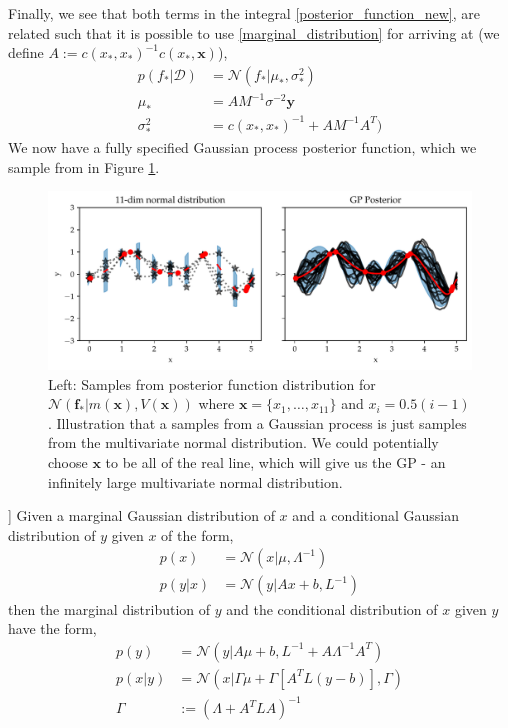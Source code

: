 Finally, we see that both terms in the integral \eqref{posterior_function_new}, are related such
that it is possible to use \eqref{marginal_distribution} for arriving at (we define $A :=  c(x_*,
x_*)^{-1} c(x_*, \textbf{x})$), 
\begin{align*}
    p(f_*|\mathcal{D}) &= \mathcal{N}(f_*|\mu_*,\sigma_*^2 )\\
    \mu_* &=  AM^{-1}\sigma^{-2}\textbf{y}\\
    \sigma_*^2 &=  c(x_*, x_*)^{-1}+AM^{-1}A^T)
\end{align*}
We now have a fully specified Gaussian process posterior function, which we sample from 
in Figure \ref{GP_illustration2}. 


\begin{figure}[h]
    \centering
    \includegraphics[width = \textwidth]{Pictures/GP2_samples_mattern.pdf}
    \caption{Left: Samples from posterior function distribution for
    $\mathcal{N}(\textbf{f}_*|m(\textbf{x}),V(\textbf{x}))$ where $\textbf{x} = \{x_1,\dots, x_{11}\}$
    and $x_i= 0.5(i-1)$. Illustration that a samples from a Gaussian process is just samples from
    the multivariate normal distribution. We could potentially choose $\textbf{x}$ to be all of the
    real line, which will give us the GP - an infinitely large multivariate normal distribution.}
    \label{GP_illustration2}
\end{figure}



\begin{testexample2}[Trick with normal distributions [from Bishops book?]]
    Given a marginal Gaussian distribution of $x$ and a conditional Gaussian distribution
    of $y$ given $x$ of the form, 
    \begin{align*}
        p(x) &= \mathcal{N}(x|\mu, \Lambda^{-1})\\
        p(y|x) &= \mathcal{N}(y|Ax+b, L^{-1})
    \end{align*}
    then the marginal distribution of $y$ and the conditional distribution of $x$ given $y$
    have the form, 
    \begin{align}
        p(y) &= \mathcal{N}(y|A\mu+b,L^{-1}+A \Lambda^{-1}A^T) \label{marginal_distribution}\\
        p(x|y) &= \mathcal{N}(x|\Gamma \mu+\Gamma [A^TL(y-b)],\Gamma )\\
        \Gamma &:= (\Lambda +A^TLA)^{-1}
    \end{align}
\end{testexample2}




